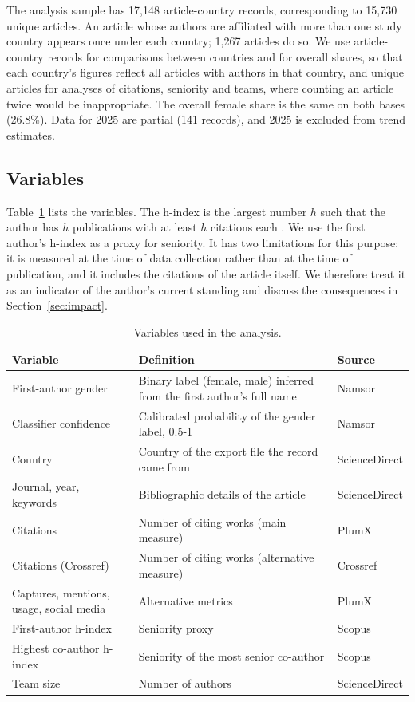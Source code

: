 \documentclass[preprint,12pt,number]{elsarticle}
\begin{document}
The analysis sample has 17,148 article-country records, corresponding to 15,730 unique articles. An article whose authors are affiliated with more than one study country appears once under each country; 1,267 articles do so. We use article-country records for comparisons between countries and for overall shares, so that each country's figures reflect all articles with authors in that country, and unique articles for analyses of citations, seniority and teams, where counting an article twice would be inappropriate. The overall female share is the same on both bases (26.8\%). Data for 2025 are partial (141 records), and 2025 is excluded from trend estimates.

\subsection{Variables}

Table~\ref{tab:variables} lists the variables. The h-index is the largest number $h$ such that the author has $h$ publications with at least $h$ citations each \citep{Hirsch2005}. We use the first author's h-index as a proxy for seniority. It has two limitations for this purpose: it is measured at the time of data collection rather than at the time of publication, and it includes the citations of the article itself. We therefore treat it as an indicator of the author's current standing and discuss the consequences in Section~\ref{sec:impact}.

\begin{table}[htbp]
\centering
\caption{Variables used in the analysis.}
\label{tab:variables}
\begin{tabular}{p{4.0cm}p{6.6cm}p{3.0cm}}
\toprule
Variable & Definition & Source \\
\midrule
First-author gender & Binary label (female, male) inferred from the first author's full name & Namsor \\
Classifier confidence & Calibrated probability of the gender label, 0.5-1 & Namsor \\
Country & Country of the export file the record came from & ScienceDirect \\
Journal, year, keywords & Bibliographic details of the article & ScienceDirect \\
Citations & Number of citing works (main measure) & PlumX \\
Citations (Crossref) & Number of citing works (alternative measure) & Crossref \\
Captures, mentions, usage, social media & Alternative metrics & PlumX \\
First-author h-index & Seniority proxy & Scopus \\
Highest co-author h-index & Seniority of the most senior co-author & Scopus \\
Team size & Number of authors & ScienceDirect \\
\bottomrule
\end{tabular}
\end{table}
\end{document}
